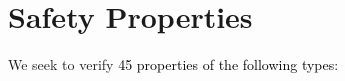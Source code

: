 



\section{Safety Properties}
We seek to verify \textcolor{black}{45 properties of the following types}:
